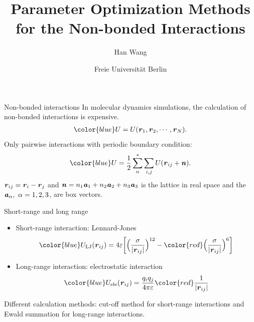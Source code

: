 \documentclass{beamer}
\newcommand{\redc}[1]{{\color{red} #1}}
\newcommand{\bluec}[1]{{\color{blue} #1}}
\renewcommand{\v}[1]{\textbf{\textit{#1}}}
\begin{document}
\title[]{Parameter Optimization Methods for the Non-bonded Interactions}
%
\author{Han Wang}
\date[THU Aug 2009]{Freie Universit\"at Berlin}
\frame{\titlepage}

\begin{frame}{Non-bonded interactions}
  In molecular dynamics simulations, the calculation of
  \redc{non-bonded interactions} is \redc{expensive}.
  \begin{align*}
    \bluec{U = U (\v r_1, \v r_2, \cdots, \v r_N)}.
  \end{align*}
  Only \redc{pairwise} interactions with \redc{periodic} boundary condition:
  \begin{align*}
    \bluec{U = \frac12\sum^\ast_{n}\sum_{i,j} U (\v r_{ij} + \v n)}.
  \end{align*}
  $\v r_{ij} = \v r_i - \v r_j$ and $\v n = n_1 \v a_1 + n_2 \v a_2 +
  n_3 \v a_3$ is the lattice in real space and the $\v a_\alpha, \
  \alpha=1,2,3$, are box vectors. \vfill
\end{frame}

\begin{frame}{Short-range and long range}
  \vfill
  \begin{itemize}
  \item \redc{Short-range} interaction: Lennard-Jones
    \begin{align*}
      \bluec{
        U_{\textrm{LJ}}(\v r_{ij}) = 4\varepsilon
        \bigg[
        \Big(\frac{\sigma}{\vert \v r_{ij}\vert}\Big)^{12} -
        \redc{\Big(\frac{\sigma}{\vert \v r_{ij}\vert}\Big)^6}
        \bigg]
      }
    \end{align*}
  \item \redc{Long-range} interaction: electrostatic interaction
    \begin{align*}
      \bluec{
        U_{\textrm{ele}}(\v r_{ij}) =
        \frac{q_iq_j}{4\pi\varepsilon}
        \redc{\frac1{\vert \v r_{ij}\vert}}
      }
    \end{align*}
  \end{itemize}
  \vfill
  Different calculation methods: \redc{cut-off} method for short-range
  interactions and \redc{Ewald summation} for long-range interactions.
  \vfill
\end{frame}
\end{document}
